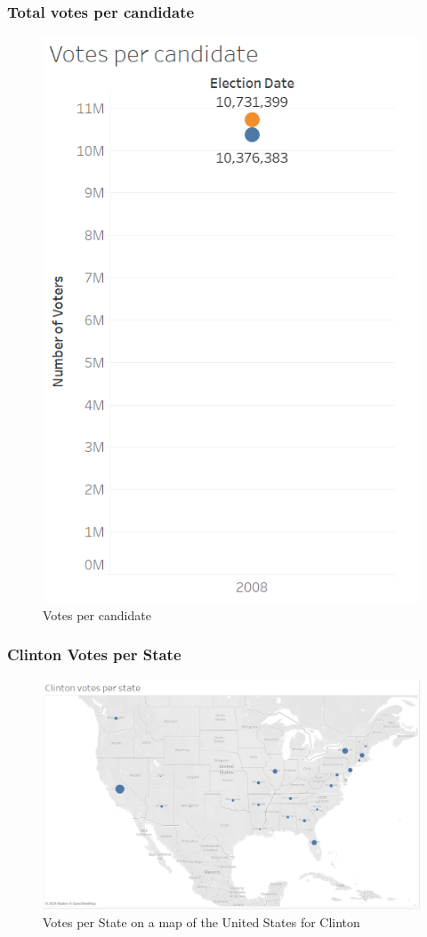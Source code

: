\documentclass[11pt]{article}
\begin{document}
\subsubsection{Total votes per candidate}
\begin{figure}[H]
    \centering
    \includegraphics[width=0.90\columnwidth]{assets/vote_candidate.PNG}
    \caption{Votes per candidate }
    \label{lr}
\end{figure}

\subsubsection{Clinton Votes per State}
\begin{figure}[H]
    \centering
    \includegraphics[width=0.90\columnwidth]{assets/clinton_state.PNG}
    \caption{Votes per State on a map of the United States for Clinton }
    \label{lr}
\end{figure}
\end{document}
